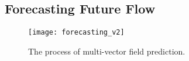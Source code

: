 \subsection{Forecasting Future Flow}
\label{sec:futureflow}

\begin{figure*}[tbh]
	\centering
	\texttt{[image: forecasting\_v2]}
	\caption{The process of multi-vector field prediction. 
	}
	\label{fig:forecasting}
\end{figure*} 

